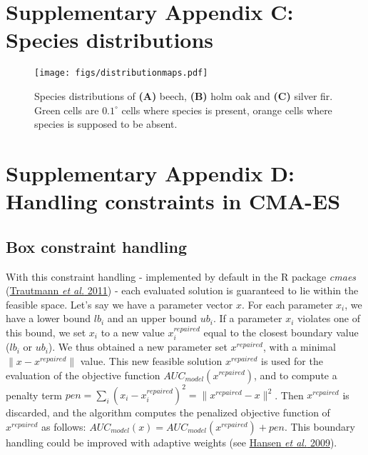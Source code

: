 \documentclass[11pt,]{article}
\begin{document}
\newpage

\newpage

\hypertarget{appendixC}{%
\section{Supplementary Appendix C: Species
distributions}\label{appendixC}}

\renewcommand*\thetable{C.\arabic{table}}
\renewcommand*\thefigure{C.\arabic{figure}}

\setcounter{figure}{0}
\setcounter{table}{0}

\renewcommand*{\thepage}{C--\arabic{page}}

\begin{figure}
\centering
\texttt{[image: figs/distributionmaps.pdf]}
\caption{Species distributions of \textbf{(A)} beech, \textbf{(B)} holm
oak and \textbf{(C)} silver fir. Green cells are \(0.1^\circ\) cells
where species is present, orange cells where species is supposed to be
absent.}
\end{figure}

\newpage

\hypertarget{appendixD}{%
\section{Supplementary Appendix D: Handling constraints in
CMA-ES}\label{appendixD}}

\renewcommand*\thetable{D.\arabic{table}}
\renewcommand*\thefigure{D.\arabic{figure}}

\setcounter{figure}{0}
\setcounter{table}{0}

\renewcommand*{\thepage}{D--\arabic{page}}

\hfill \break

\hypertarget{box-constraint-handling}{%
\subsection{Box constraint handling}\label{box-constraint-handling}}

With this constraint handling - implemented by default in the R package
\emph{cmaes} (\protect\hyperlink{ref-Trautmann2011}{Trautmann \emph{et
al.} 2011}) - each evaluated solution is guaranteed to lie within the
feasible space. Let's say we have a parameter vector \(x\). For each
parameter \(x_i\), we have a lower bound \(lb_i\) and an upper bound
\(ub_i\). If a parameter \(x_i\) violates one of this bound, we set
\(x_i\) to a new value \(x_i^{repaired}\) equal to the closest boundary
value (\(lb_i\) or \(ub_i\)). We thus obtained a new parameter set
\(x^{repaired}\), with a minimal \(\|x-x^{repaired}\|\) value. This new
feasible solution \(x^{repaired}\) is used for the evaluation of the
objective function \(AUC_{model}(x^{repaired})\), and to compute a
penalty term
\(pen=\sum\limits_{i}(x_i-x_i^{repaired})^2=\|x^{repaired}-x\|^2\). Then
\(x^{repaired}\) is discarded, and the algorithm computes the penalized
objective function of \(x^{repaired}\) as follows:
\(AUC_{model}(x)=AUC_{model}(x^{repaired})+pen\). This boundary handling
could be improved with adaptive weights (see
\protect\hyperlink{ref-Hansen2009}{Hansen \emph{et al.} 2009}).
\end{document}
